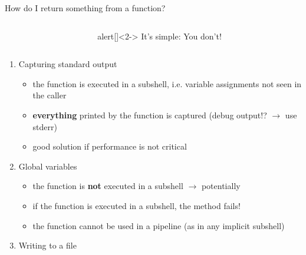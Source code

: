 \begin{frame}[fragile]{How do I return something from a function?}
    \vspace{-15.2mm}
    \begin{overlayarea}{\textwidth}{0.7\textheight}
        \begin{columns}[c]
            \begin{column}{0.55\textwidth}
            \end{column}
            \begin{column}{0.35\textwidth}
                \begin{varblock}{alert}[\textwidth]{}<2->
                    \Large It's simple: \alert{You don't!}
                \end{varblock}
            \end{column}
        \end{columns}
        \smallskip
        \begin{enumerate}
            \item<only@3-> Capturing standard output
                           \begin{itemize}[<only@{3,7}>]
                               \item[\crossmark] the function is executed in a subshell, i.e. variable assignments not seen in the caller
                               \item[\crossmark] \textbf{everything} printed by the function is captured (debug output!? $\to$ use stderr)
                               \item[\checkmark] good solution if performance is not critical
                           \end{itemize}
            \item<only@4-> Global variables
                           \begin{itemize}[<only@{4,7}>]
                               \item[\checkmark] the function is \textbf{not} executed in a subshell $\to$ potentially 
                               \item[\crossmark] if the function is executed in a subshell, the method fails!
                               \item[\crossmark] the function cannot be used in a pipeline (as in any implicit subshell)
                           \end{itemize}
            \item<only@5-> Writing to a file

\end{enumerate}
\end{overlayarea}
\end{frame}
